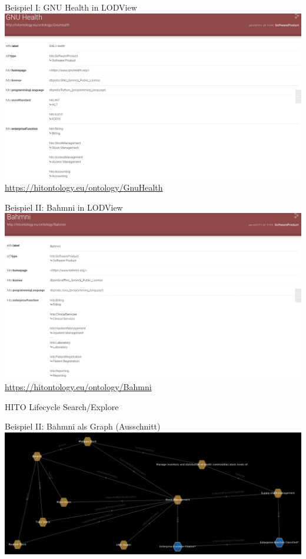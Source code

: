 \documentclass[aspectratio=1610,12pt]{beamer}
\begin{document}
\begin{frame}{Beispiel I: GNU Health in LODView}
\vspace{-0.3cm}
\centering
\includegraphics[width=.95\textwidth]{img/GnuHealth.png}
\footnotesize{\url{https://hitontology.eu/ontology/GnuHealth}}
\end{frame}

\begin{frame}{Beispiel II: Bahmni in LODView}
\vspace{-0.3cm}
\centering
\includegraphics[width=.95\textwidth]{img/bahmni.png}
\footnotesize{\url{https://hitontology.eu/ontology/Bahmni}}
\end{frame}

\begin{frame}{HITO Lifecycle Search/Explore}
  \centering
  \vspace{-0.5cm}
\end{frame}

\begin{frame}{Beispiel II: Bahmni als Graph (Ausschnitt)}
  \includegraphics[width=\textwidth, height=.65\textheight]{img/bahmni_star.png}
\end{frame}
\end{document}
